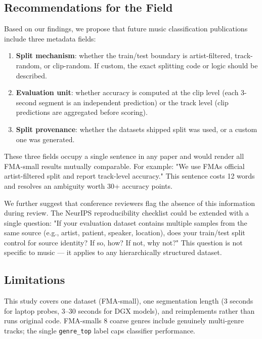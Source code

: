 \documentclass[conference]{IEEEtran}
\begin{document}
\subsection{Recommendations for the
Field}\label{g.-recommendations-for-the-field}

Based on our findings, we propose that future music classification
publications include three metadata fields:

\begin{enumerate}
\def\labelenumi{\arabic{enumi}.}
\item
  \textbf{Split mechanism}: whether the train/test boundary is
  artist-filtered, track-random, or clip-random. If custom, the exact
  splitting code or logic should be described.
\item
  \textbf{Evaluation unit}: whether accuracy is computed at the clip
  level (each 3-second segment is an independent prediction) or the
  track level (clip predictions are aggregated before scoring).
\item
  \textbf{Split provenance}: whether the dataset\textquotesingle s
  shipped split was used, or a custom one was generated.
\end{enumerate}

These three fields occupy a single sentence in any paper and would
render all FMA-small results mutually comparable. For example: "We use
FMA\textquotesingle s official artist-filtered split and report
track-level accuracy." This sentence costs 12 words and resolves an
ambiguity worth 30+ accuracy points.

We further suggest that conference reviewers flag the absence of this
information during review. The NeurIPS reproducibility checklist
\citep{pineau2021neurips} could be extended with a single question: "If
your evaluation dataset contains multiple samples from the same source
(e.g., artist, patient, speaker, location), does your train/test split
control for source identity? If so, how? If not, why not?" This question
is not specific to music --- it applies to any hierarchically
structured dataset.

\subsection{Limitations}\label{h.-limitations}

This study covers one dataset (FMA-small), one segmentation length (3
seconds for laptop probes, 3--30 seconds for DGX models), and
reimplements rather than runs original code. FMA-small\textquotesingle s
8 coarse genres include genuinely multi-genre tracks; the single
\texttt{genre\_top} label caps classifier performance.
\end{document}
